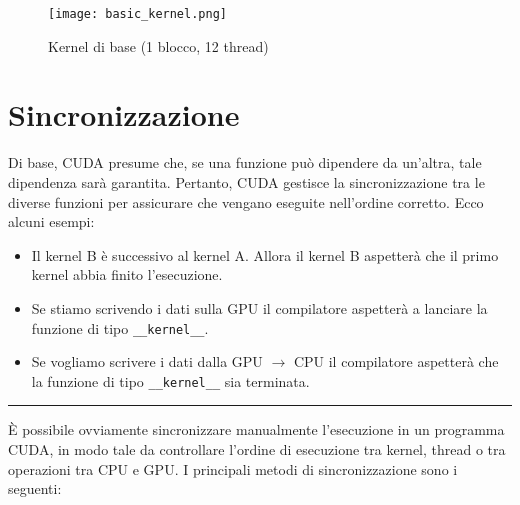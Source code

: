 \documentclass[12pt,a4paper]{report}
\begin{document}
\begin{figure}[h]
    \texttt{[image: basic\_kernel.png]}
    \caption{Kernel di base (1 blocco, 12 thread) \cite{CUDAtutorial}}
\end{figure}

\section{Sincronizzazione}

Di base, CUDA presume che, se una funzione può dipendere da un'altra, tale dipendenza sarà garantita. Pertanto, CUDA gestisce la sincronizzazione tra le diverse funzioni per assicurare che vengano eseguite nell'ordine corretto.
Ecco alcuni esempi:

\begin{itemize}
    \item Il kernel B è successivo al kernel A. Allora il kernel B aspetterà che il primo kernel abbia finito l'esecuzione.
    \item Se stiamo scrivendo i dati sulla GPU il compilatore aspetterà a lanciare la funzione di tipo \texttt{\_\_kernel\_\_}.
    \item Se vogliamo scrivere i dati dalla GPU \(\rightarrow\) CPU il compilatore aspetterà che la funzione di tipo \texttt{\_\_kernel\_\_} sia terminata.
\end{itemize}

\vspace{8mm}
\hrule
\vspace{3mm}

È possibile ovviamente sincronizzare manualmente l'esecuzione in un programma CUDA, in modo tale da controllare l'ordine di esecuzione tra kernel, thread o tra operazioni tra CPU e GPU.  I principali metodi di sincronizzazione sono i seguenti:
\end{document}
